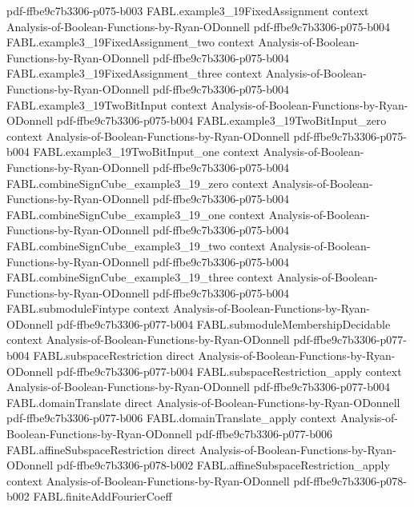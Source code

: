 \begin{theorem}
  {pdf-ffbe9c7b3306-p075-b003}
\proofstep
  {FABL.example3_19FixedAssignment}
  {context}
  {Analysis-of-Boolean-Functions-by-Ryan-ODonnell}
  {pdf-ffbe9c7b3306-p075-b004}
\proofstep
  {FABL.example3_19FixedAssignment_two}
  {context}
  {Analysis-of-Boolean-Functions-by-Ryan-ODonnell}
  {pdf-ffbe9c7b3306-p075-b004}
\proofstep
  {FABL.example3_19FixedAssignment_three}
  {context}
  {Analysis-of-Boolean-Functions-by-Ryan-ODonnell}
  {pdf-ffbe9c7b3306-p075-b004}
\proofstep
  {FABL.example3_19TwoBitInput}
  {context}
  {Analysis-of-Boolean-Functions-by-Ryan-ODonnell}
  {pdf-ffbe9c7b3306-p075-b004}
\proofstep
  {FABL.example3_19TwoBitInput_zero}
  {context}
  {Analysis-of-Boolean-Functions-by-Ryan-ODonnell}
  {pdf-ffbe9c7b3306-p075-b004}
\proofstep
  {FABL.example3_19TwoBitInput_one}
  {context}
  {Analysis-of-Boolean-Functions-by-Ryan-ODonnell}
  {pdf-ffbe9c7b3306-p075-b004}
\proofstep
  {FABL.combineSignCube_example3_19_zero}
  {context}
  {Analysis-of-Boolean-Functions-by-Ryan-ODonnell}
  {pdf-ffbe9c7b3306-p075-b004}
\proofstep
  {FABL.combineSignCube_example3_19_one}
  {context}
  {Analysis-of-Boolean-Functions-by-Ryan-ODonnell}
  {pdf-ffbe9c7b3306-p075-b004}
\proofstep
  {FABL.combineSignCube_example3_19_two}
  {context}
  {Analysis-of-Boolean-Functions-by-Ryan-ODonnell}
  {pdf-ffbe9c7b3306-p075-b004}
\proofstep
  {FABL.combineSignCube_example3_19_three}
  {context}
  {Analysis-of-Boolean-Functions-by-Ryan-ODonnell}
  {pdf-ffbe9c7b3306-p075-b004}
\proofstep
  {FABL.submoduleFintype}
  {context}
  {Analysis-of-Boolean-Functions-by-Ryan-ODonnell}
  {pdf-ffbe9c7b3306-p077-b004}
\proofstep
  {FABL.submoduleMembershipDecidable}
  {context}
  {Analysis-of-Boolean-Functions-by-Ryan-ODonnell}
  {pdf-ffbe9c7b3306-p077-b004}
\proofstep
  {FABL.subspaceRestriction}
  {direct}
  {Analysis-of-Boolean-Functions-by-Ryan-ODonnell}
  {pdf-ffbe9c7b3306-p077-b004}
\proofstep
  {FABL.subspaceRestriction_apply}
  {context}
  {Analysis-of-Boolean-Functions-by-Ryan-ODonnell}
  {pdf-ffbe9c7b3306-p077-b004}
\proofstep
  {FABL.domainTranslate}
  {direct}
  {Analysis-of-Boolean-Functions-by-Ryan-ODonnell}
  {pdf-ffbe9c7b3306-p077-b006}
\proofstep
  {FABL.domainTranslate_apply}
  {context}
  {Analysis-of-Boolean-Functions-by-Ryan-ODonnell}
  {pdf-ffbe9c7b3306-p077-b006}
\proofstep
  {FABL.affineSubspaceRestriction}
  {direct}
  {Analysis-of-Boolean-Functions-by-Ryan-ODonnell}
  {pdf-ffbe9c7b3306-p078-b002}
\proofstep
  {FABL.affineSubspaceRestriction_apply}
  {context}
  {Analysis-of-Boolean-Functions-by-Ryan-ODonnell}
  {pdf-ffbe9c7b3306-p078-b002}
\proofstep
  {FABL.finiteAddFourierCoeff}

\end{theorem}
